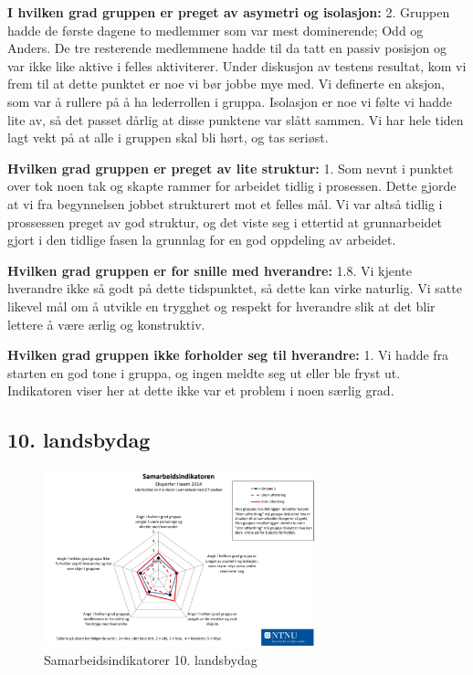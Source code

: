 \noindent \textbf{I hvilken grad gruppen er preget av asymetri og isolasjon:} 2.
\newline
\noindent Gruppen hadde de første dagene to medlemmer som var mest dominerende; Odd og Anders.
De tre resterende medlemmene hadde til da tatt en passiv posisjon og var ikke like aktive i felles aktiviterer. 
Under diskusjon av testens resultat, kom vi frem til at dette punktet er noe vi bør jobbe mye med. Vi definerte en aksjon, som var å rullere på å ha lederrollen i gruppa. 
Isolasjon er noe vi følte vi hadde lite av, så det passet dårlig at disse punktene var slått sammen. Vi har hele tiden lagt vekt på at alle i gruppen skal bli hørt, og tas seriøst. 

\vspace{\secspace}

\noindent \textbf{Hvilken grad gruppen er preget av lite struktur:} 1.
\newline
\noindent Som nevnt i punktet over tok noen tak og skapte rammer for arbeidet tidlig i prosessen. Dette gjorde at vi fra begynnelsen jobbet strukturert mot et felles mål. Vi var altså tidlig i prossessen preget av god struktur, og det viste seg i ettertid at grunnarbeidet gjort i den tidlige fasen la grunnlag for en god oppdeling av arbeidet. 
\vspace{\secspace}

\noindent \textbf{Hvilken grad gruppen er for snille med hverandre:} 1.8.
\newline
\noindent Vi kjente hverandre ikke så godt på dette tidspunktet, så dette kan virke naturlig. Vi satte likevel mål om å utvikle en trygghet og respekt for hverandre slik at det blir lettere å være ærlig og konstruktiv.
\vspace{\secspace}

\noindent \textbf{Hvilken grad gruppen ikke forholder seg til hverandre:} 1.
\newline
\noindent Vi hadde fra starten en god tone i gruppa, og ingen meldte seg ut eller ble fryst ut. Indikatoren viser her at dette ikke var et problem i noen særlig grad.

\subsection{10. landsbydag}
\begin{figure}[H]
    \centering
    \includegraphics[width=0.7\textwidth]{images/samarbeidsindikator1.jpeg} 
    \caption{Samarbeidsindikatorer 10. landsbydag}
    \label{fig:sam2}
\end{figure}